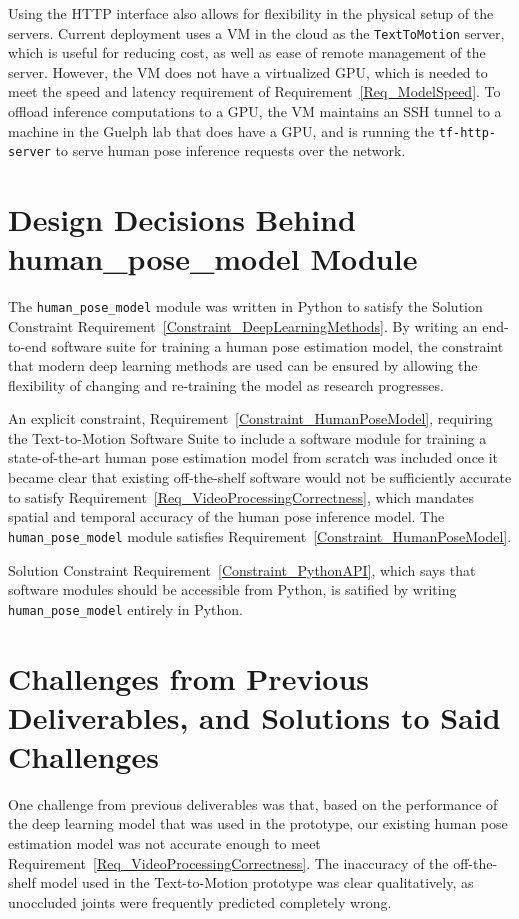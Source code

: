 \documentclass{scrreprt}
\begin{document}
Using the HTTP interface also allows for flexibility in the physical setup of
the servers. Current deployment uses a VM in the cloud as the
\verb|TextToMotion| server, which is useful for reducing cost, as well as ease
of remote management of the server. However, the VM does not have a virtualized
GPU, which is needed to meet the speed and latency requirement of
Requirement~\ref{Req_ModelSpeed}. To offload inference
computations to a GPU, the VM maintains an SSH tunnel to a machine in the
Guelph lab that does have a GPU, and is running the \verb|tf-http-server| to
serve human pose inference requests over the network.

\section{Design Decisions Behind human\_pose\_model Module}

The \verb|human_pose_model| module was written in Python to satisfy the
Solution Constraint Requirement~\ref{Constraint_DeepLearningMethods}. By
writing an end-to-end software suite for training a human pose estimation
model, the constraint that modern deep learning methods are used can be ensured
by allowing the flexibility of changing and re-training the model as research
progresses.

An explicit constraint, Requirement~\ref{Constraint_HumanPoseModel}, requiring
the Text-to-Motion Software Suite to include a software module for training a
state-of-the-art human pose estimation model from scratch was included once it
became clear that existing off-the-shelf software would not be sufficiently
accurate to satisfy Requirement~\ref{Req_VideoProcessingCorrectness}, which
mandates spatial and temporal accuracy of the human pose inference model. The
\verb|human_pose_model| module satisfies
Requirement~\ref{Constraint_HumanPoseModel}.

Solution Constraint Requirement~\ref{Constraint_PythonAPI}, which says that
software modules should be accessible from Python, is satified by writing
\verb|human_pose_model| entirely in Python.

\section{Challenges from Previous Deliverables, and Solutions to Said
         Challenges}

One challenge from previous deliverables was that, based on the performance of
the deep learning model that was used in the prototype, our existing human pose
estimation model was not accurate enough to meet
Requirement~\ref{Req_VideoProcessingCorrectness}. The inaccuracy of the
off-the-shelf model used in the Text-to-Motion prototype was clear
qualitatively, as unoccluded joints were frequently predicted completely wrong.
\end{document}
